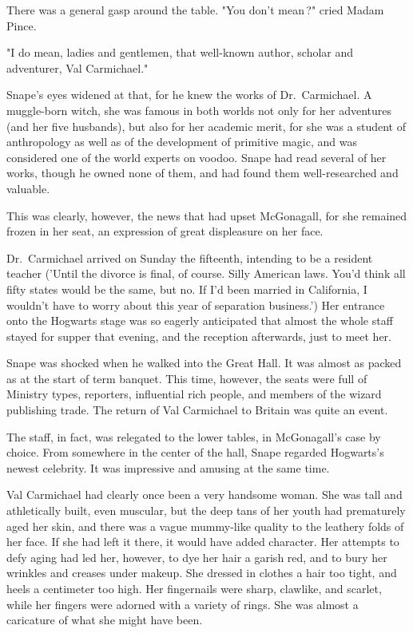 There was a general gasp around the table. "You don't mean{\el}\,?" cried Madam Pince.

"I do mean, ladies and gentlemen, that well-known author, scholar and adventurer, Val Carmichael."

Snape's eyes widened at that, for he knew the works of Dr.~Carmichael. A muggle-born witch, she was famous in both worlds not only for her adventures (and her five husbands), but also for her academic merit, for she was a student of anthropology as well as of the development of primitive magic, and was considered one of the world experts on voodoo. Snape had read several of her works, though he owned none of them, and had found them well-researched and valuable.

This was clearly, however, the news that had upset McGonagall, for she remained frozen in her seat, an expression of great displeasure on her face.

Dr.~Carmichael arrived on Sunday the fifteenth, intending to be a resident teacher ('Until the divorce is final, of course. Silly American laws. You'd think all fifty states would be the same, but no. If I'd been married in California, I wouldn't have to worry about this year of separation business.') Her entrance onto the Hogwarts stage was so eagerly anticipated that almost the whole staff stayed for supper that evening, and the reception afterwards, just to meet her.

Snape was shocked when he walked into the Great Hall. It was almost as packed as at the start of term banquet. This time, however, the seats were full of Ministry types, reporters, influential rich people, and members of the wizard publishing trade. The return of Val Carmichael to Britain was quite an event.

The staff, in fact, was relegated to the lower tables, in McGonagall's case by choice. From somewhere in the center of the hall, Snape regarded Hogwarts's newest celebrity. It was impressive and amusing at the same time.

Val Carmichael had clearly once been a very handsome woman. She was tall and athletically built, even muscular, but the deep tans of her youth had prematurely aged her skin, and there was a vague mummy-like quality to the leathery folds of her face. If she had left it there, it would have added character. Her attempts to defy aging had led her, however, to dye her hair a garish red, and to bury her wrinkles and creases under makeup. She dressed in clothes a hair too tight, and heels a centimeter too high. Her fingernails were sharp, clawlike, and scarlet, while her fingers were adorned with a variety of rings. She was almost a caricature of what she might have been.

